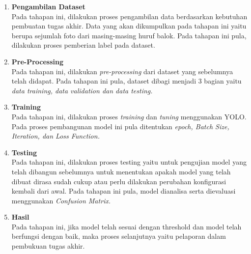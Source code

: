 \begin{enumerate}
   \item \textbf{Pengambilan Dataset} \\
   Pada tahapan ini, dilakukan proses pengambilan data berdasarkan kebutuhan pembuatan tugas akhir. Data yang akan dikumpulkan pada tahapan ini yaitu berupa sejumlah foto dari masing-masing huruf balok. Pada tahapan ini pula, dilakukan proses pemberian label pada dataset.
   \item \textbf{Pre-Processing} \\
   Pada tahapan ini, dilakukan \textit{pre-processing} dari dataset yang sebelumnya telah didapat. Pada tahapan ini pula, dataset dibagi menjadi 3 bagian yaitu \textit{data training, data validation dan data testing. }
   \item \textbf{Training} \\
   Pada tahapan ini, dilakukan proses \textit{training} dan \textit{tuning} menggunakan YOLO. Pada proses pembangunan model ini pula ditentukan \textit{epoch, Batch Size, Iteration, dan Loss Function.}
   \item \textbf{Testing} \\
   Pada tahapan ini, dilakukan proses testing yaitu untuk pengujian model yang telah dibangun sebelumnya untuk menentukan apakah model yang telah dibuat dirasa sudah cukup atau perlu dilakukan perubahan konfigurasi kembali dari awal. Pada tahapan ini pula, model dianalisa serta dievaluasi menggunakan \textit{Confusion Matrix.}
   \item \textbf{Hasil} \\
   Pada tahapan ini, jika model telah sesuai dengan threshold dan model telah berfungsi dengan baik, maka proses selanjutnya yaitu pelaporan dalam pembukuan tugas akhir.
\end{enumerate}
